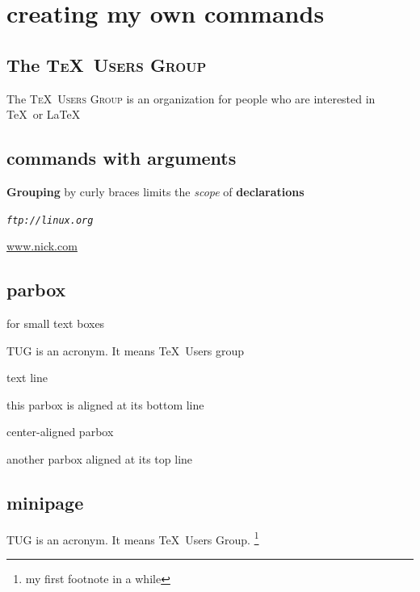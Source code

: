 \documentclass[letterpaper,11pt]{article}
\begin{document}
\section{creating my own commands}

\newcommand{\TUG}{\textsc{ \TeX\ Users Group}\xspace} %

\subsection{ The \TUG}
The \TUG is an organization for people who are interested in \TeX\ or \LaTeX
\subsection{commands with arguments}
\newcommand{\keyword}[2][\bfseries]{{#1#2}}

\keyword{Grouping} by curly braces limits the \keyword[\itshape]{scope} of \keyword{declarations}

\newcommand{\site}[2][https]{\textit{\texttt{#1://#2}}}

\site[ftp]{linux.org}


\url{www.nick.com}


\subsection{parbox}

for small text boxes

\parbox{3cm}{TUG is an acronym.  It means \TeX\ Users group}


text line
\quad\parbox[b]{1.8cm}{this parbox is aligned at its bottom line}
\quad\parbox{1.5cm}{center-aligned parbox}
\quad\parbox[t]{2cm}{another parbox aligned at its top line}

\subsection{minipage}


\begin{minipage}{5cm}
  TUG is an acronym. It means \TeX\ Users Group. \footnote{my first footnote in a while}
\end{minipage}
\end{document}
